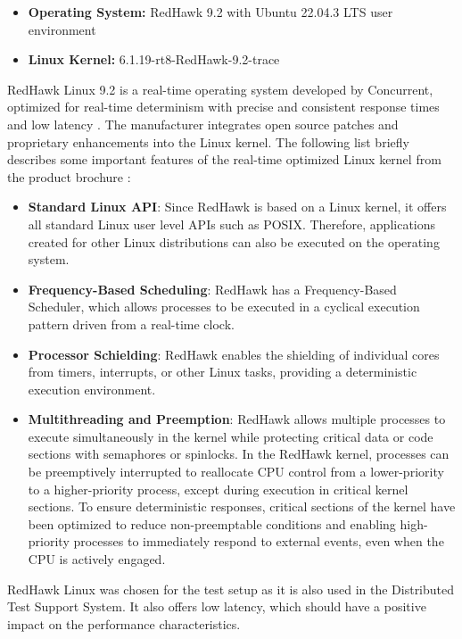 \begin{itemize}
\item \textbf{Operating System:} RedHawk 9.2 with Ubuntu 22.04.3 LTS user environment
\item \textbf{Linux Kernel:} 6.1.19-rt8-RedHawk-9.2-trace
\end{itemize}

RedHawk Linux 9.2 is a real-time operating system developed by Concurrent, optimized for real-time determinism with precise and consistent response times and low latency \cite{swsetup01}. The manufacturer integrates open source patches and proprietary enhancements into the Linux kernel. The following list briefly describes some important features of the real-time optimized Linux kernel from the product brochure \cite{swsetup02}:

\begin{itemize}
\item \textbf{Standard Linux API}: Since RedHawk is based on a Linux kernel, it offers all standard Linux user level APIs such as POSIX. Therefore, applications created for other Linux distributions can also be executed on the operating system.
\item \textbf{Frequency-Based Scheduling}: RedHawk has a Frequency-Based Scheduler, which allows processes to be executed in a cyclical execution pattern driven from a real-time clock.
\item \textbf{Processor Schielding}: RedHawk enables the shielding of individual cores from timers, interrupts, or other Linux tasks, providing a deterministic execution environment.
\item \textbf{Multithreading and Preemption}: RedHawk allows multiple processes to execute simultaneously in the kernel while protecting critical data or code sections with semaphores or spinlocks. In the RedHawk kernel, processes can be preemptively interrupted to reallocate CPU control from a lower-priority to a higher-priority process, except during execution in critical kernel sections. To ensure deterministic responses, critical sections of the kernel have been optimized to reduce non-preemptable conditions and enabling high-priority processes to immediately respond to external events, even when the CPU is actively engaged.
\end{itemize}

RedHawk Linux was chosen for the test setup as it is also used in the Distributed Test Support System. It also offers low latency, which should have a positive impact on the performance characteristics.

